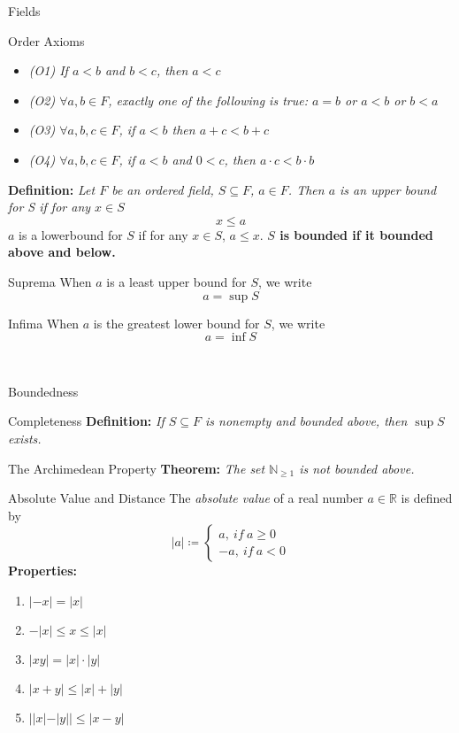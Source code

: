 \documentclass{article}
\begin{document}
\begin{multicols*}{3}
\begin{blackbox}{Fields}
\begin{bluebox}{Order Axioms}
\begin{itemize}
                \item \textit{(O1) If $a<b$ and $b<c$, then $a < c$}
                \item \textit{(O2) $\forall a,b \in F$, exactly one of the following is true: $a = b$ or $a < b$ or $b < a$}
                \item \textit{(O3) $\forall a,b,c \in F$, if $a<b$ then $a + c < b + c$}
                \item \textit{(O4) $\forall a,b,c \in F$, if $a< b$ and $0 < c$, then $a \cdot c < b \cdot b$}
                \end{itemize}
    \end{bluebox}
    \textbf{Definition:}\textit{ Let $F$ be an ordered field, $S \subseteq F$, $a \in F$. Then $a$ is an upper bound for S if for any $x\in S$}\\[-3ex]
    \[x \leq a\]
    $a$ is a lowerbound for $S$ if for any $x \in S$, $a \leq x$. 
        \textbf{$S$ is bounded if it bounded above and below.}
    \begin{redbox}{Suprema}
        When $a$ is a least upper bound for $S$, we write
        \[a = \sup S\]
    \end{redbox}
    \begin{pinkbox}{Infima}
        When $a$ is the greatest lower bound for $S$, we write
        \[a = \inf S\]
    \end{pinkbox}\\[-2ex]
\end{blackbox}
\begin{blackbox}{Boundedness}
    \begin{brownbox}{Completeness}
        \textbf{Definition:} \textit{If $S \subseteq F$ is nonempty and bounded above, then $\sup S$ exists.}
    \end{brownbox}
        \begin{brownbox}{The Archimedean Property}
    \textbf{Theorem:} \textit{The set $\mathbb{N}_{\geq1}$ is not bounded above.}
    \end{brownbox}
    \begin{pinkbox}{Absolute Value and Distance}
    The \textit{absolute value} of a real number $a \in \mathbb{R}$ is defined by 
    \[|a| \coloneqq \begin{cases}
    a, \ if \ a \geq 0\\
    -a, \ if \ a < 0
    \end{cases}\]
    \textbf{Properties:}
    \begin{multicols*}{2}
        \begin{enumerate}[label=(\roman*)]
            \item $|-x| = |x|$
            \item $-|x| \leq x \leq |x|$
            \item $|xy| = |x|\cdot |y|$
            \item $|x+y| \leq |x| + |y|$
            \item $||x|-|y|| \leq |x-y|$
        \end{enumerate} 
    \end{multicols*}


\end{pinkbox}
\end{blackbox}
\end{multicols*}
\end{document}
